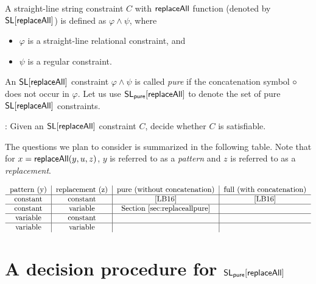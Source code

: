 \documentclass{llncs}
\begin{document}
\begin{definition}
A straight-line string constraint $C$ with $\mathsf{replaceAll}$ function (denoted by $\mathsf{SL}[\mathsf{replaceAll}]$)  is defined as $ \varphi \wedge \psi$,  where 
\begin{itemize}
\item $\varphi$ is a straight-line relational constraint,  and
%
\item $\psi$ is a regular constraint.
%
\end{itemize}
An $\mathsf{SL}[\mathsf{replaceAll}]$ constraint $\varphi \wedge \psi$ is called \emph{pure} if the concatenation symbol $\circ$ does not occur in $\varphi$. Let us use $\mathsf{SL_{pure}}[\mathsf{replaceAll}]$ to denote the set of pure $\mathsf{SL}[\mathsf{replaceAll}]$ constraints.
\end{definition}


: Given an $\mathsf{SL}[\mathsf{replaceAll}]$ constraint $C$, decide whether $C$ is satisfiable.

The questions we plan to consider is summarized in the following table. Note that for $x=\mathsf{replaceAll} (y,u,z)$, $y$ is referred to as a \emph{pattern} and $z$ is referred to as a \emph{replacement}.

\[
\begin{tabular}{c|c|c|c}
                             pattern (y)  &   replacement (z)        &   pure (without concatenation) &  full (with concatenation) \\
                              \hline
                              constant  &   constant                       & \cite{LB16}    &  \cite{LB16}   \\
 \hline
                              constant  &   variable                       &  Section \ref{sec:replaceallpure}       &    \\
 \hline
                              variable  &   constant                       &         &    \\
\hline
                              variable  &   variable                       &        &    \\
\end{tabular}
\]


\section{A decision procedure for $\mathsf{SL_{pure}}[\mathsf{replaceAll}]$} \label{sec:replaceallpure}
\end{document}
